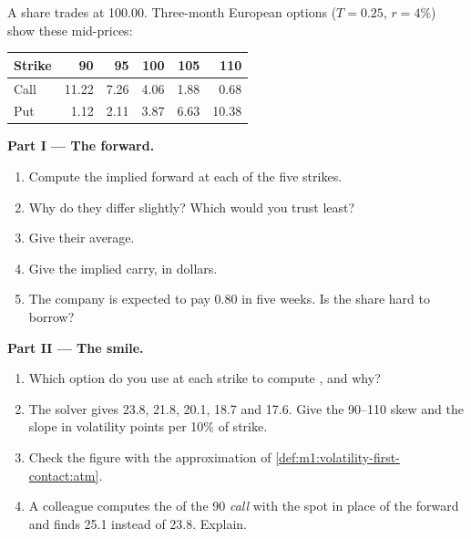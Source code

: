 \begin{problem}\label{pb:m1:volatility-first-contact:1}
A share trades at 100.00. Three-month European options ($T = 0.25$, $r = 4\%$)
show these mid-prices:

\begin{center}\small
\begin{tabular}{lrrrrr}
\toprule
Strike & 90 & 95 & 100 & 105 & 110 \\
\midrule
Call & 11.22 & 7.26 & 4.06 & 1.88 & 0.68 \\
Put & 1.12 & 2.11 & 3.87 & 6.63 & 10.38 \\
\bottomrule
\end{tabular}
\end{center}

\medskip\noindent\textbf{Part I --- The forward.}
\begin{enumerate}
\item Compute the implied forward at each of the five strikes.
\item Why do they differ slightly? Which would you trust least?
\item Give their average.
\item Give the implied carry, in dollars.
\item The company is expected to pay 0.80 in five weeks. Is the share hard
to borrow?
\end{enumerate}

\medskip\noindent\textbf{Part II --- The smile.}
\begin{enumerate}[resume]
\item Which option do you use at each strike to compute ,
and why?
\item The solver gives 23.8, 21.8, 20.1, 18.7 and 17.6. Give the 90--110 skew
and the slope in volatility points per 10\% of strike.
\item Check the  figure with the approximation of
\cref{def:m1:volatility-first-contact:atm}.
\item A colleague computes the  of the 90 \emph{call} with
the spot in place of the forward and finds 25.1 instead of 23.8. Explain.
\end{enumerate}


\end{problem}
